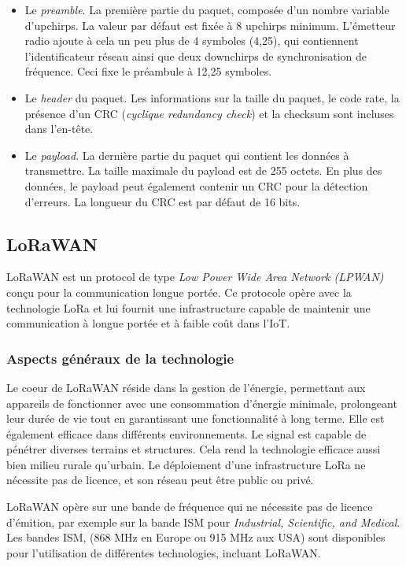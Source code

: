 \begin{itemize}
\item Le \textit{preamble}. La première partie du paquet, composée d'un nombre variable d'upchirps. La valeur par défaut est fixée à 8 upchirps minimum. L'émetteur radio ajoute à cela un peu plus de 4 symboles (4,25), qui contiennent l'identificateur réseau ainsi que deux downchirps de synchronisation de fréquence. Ceci fixe le préambule à 12,25 symboles.
\item Le \textit{header} du paquet. Les informations sur la taille du paquet, le code rate, la présence d'un CRC (\textit{cyclique redundancy check}) et la checksum sont incluses dans l'en-tête.
\item Le \textit{payload}. La dernière partie du paquet qui contient les données à transmettre. La taille maximale du payload est de 255 octets. En plus des données, le payload peut également contenir un CRC pour la détection d'erreurs. La longueur du CRC est par défaut de 16 bits.
\end{itemize}

\newpage
\subsection{LoRaWAN}\label{lorawan}

LoRaWAN est un protocol de type \textit{Low Power Wide Area Network (LPWAN)} conçu pour la communication longue portée. Ce protocole opère avec la technologie LoRa et lui fournit une infrastructure capable de maintenir une communication à longue portée et à faible coût dans l'IoT.

\subsubsection{Aspects généraux de la technologie}

Le coeur de LoRaWAN réside dans la gestion de l'énergie, permettant aux appareils de fonctionner avec une consommation d'énergie minimale, prolongeant leur durée de vie tout en garantissant une fonctionnalité à long terme. Elle est également efficace dans différents environnements. Le signal est capable de pénétrer diverses terrains et structures. Cela rend la technologie efficace aussi bien milieu rurale qu'urbain.
Le déploiement d'une infrastructure LoRa ne nécessite pas de licence, et son réseau peut être public ou privé.

\vspace{0.1cm}

LoRaWAN opère sur une bande de fréquence qui ne nécessite pas de licence d'émition, par exemple sur la bande ISM pour \textit{Industrial, Scientific, and Medical}. Les bandes ISM, (868 MHz en Europe ou 915 MHz aux USA) sont disponibles pour l'utilisation de différentes technologies, incluant LoRaWAN.

